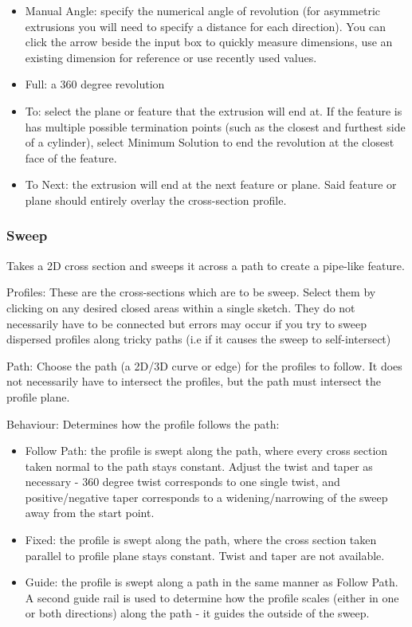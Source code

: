 \begin{itemize}
    \item Manual Angle: specify the numerical angle of revolution (for asymmetric extrusions you will need to specify a distance for each direction). You can click the arrow beside the input box to quickly measure dimensions, use an existing dimension for reference or use recently used values.
    \item Full: a 360 degree revolution
    \item To: select the plane or feature that the extrusion will end at. If the feature is has multiple possible termination points (such as the closest and furthest side of a cylinder), select Minimum Solution to end the revolution at the closest face of the feature.
    \item To Next: the extrusion will end at the next feature or plane. Said feature or plane should entirely overlay the cross-section profile.
\end{itemize}

\subsubsection{Sweep}
Takes a 2D cross section and sweeps it across a path to create a pipe-like feature.

Profiles:
These are the cross-sections which are to be sweep. Select them by clicking on any desired closed areas within a single sketch. They do not necessarily have to be connected but errors may occur if you try to sweep dispersed profiles along tricky paths (i.e if it causes the sweep to self-intersect)

Path:
Choose the path (a 2D/3D curve or edge) for the profiles to follow. It does not necessarily have to intersect the profiles, but the path must intersect the profile plane.

Behaviour:
Determines how the profile follows the path:

\begin{itemize}
    \item Follow Path: the profile is swept along the path, where every cross section taken normal to the path stays constant. Adjust the twist and taper as necessary - 360 degree twist corresponds to one single twist, and positive/negative taper corresponds to a widening/narrowing of the sweep away from the start point.
    \item Fixed: the profile is swept along the path, where the cross section taken parallel to profile plane stays constant. Twist and taper are not available.
    \item Guide: the profile is swept along a path in the same manner as Follow Path. A second guide rail is used to determine how the profile scales (either in one or both directions) along the path - it guides the outside of the sweep.
\end{itemize}


